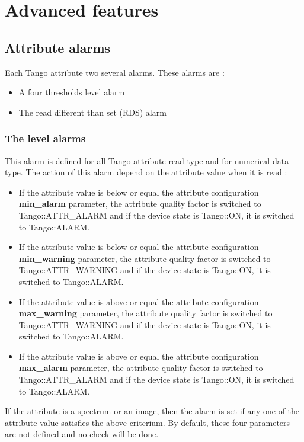 
\chapter{Advanced features}

\section{Attribute alarms}

Each Tango attribute two several alarms. These alarms are :
\begin{itemize}
\item A four thresholds level alarm
\item The read different than set (RDS) alarm
\end{itemize}

\subsection{The level alarms}

This alarm is defined for all Tango attribute read type and for numerical
data type. The action of this alarm depend on the attribute value
when it is read :
\begin{itemize}
\item If the attribute value is below or equal the attribute configuration
\textbf{min\_alarm} parameter, the attribute quality
factor is switched to Tango::ATTR\_ALARM and if
the device state is Tango::ON, it is switched to Tango::ALARM. 
\item If the attribute value is below or equal the attribute configuration
\textbf{min\_warning} parameter, the attribute
quality factor is switched to Tango::ATTR\_WARNING
and if the device state is Tango::ON, it is switched to Tango::ALARM.
\item If the attribute value is above or equal the attribute configuration
\textbf{max\_warning} parameter, the attribute
quality factor is switched to Tango::ATTR\_WARNING
and if the device state is Tango::ON, it is switched to Tango::ALARM.
\item If the attribute value is above or equal the attribute configuration
\textbf{max\_alarm} parameter, the attribute quality
factor is switched to Tango::ATTR\_ALARM and if
the device state is Tango::ON, it is switched to Tango::ALARM.
\end{itemize}
If the attribute is a spectrum or an image, then the alarm is set
if any one of the attribute value satisfies the above criterium. By
default, these four parameters are not defined and no check will be
done.

